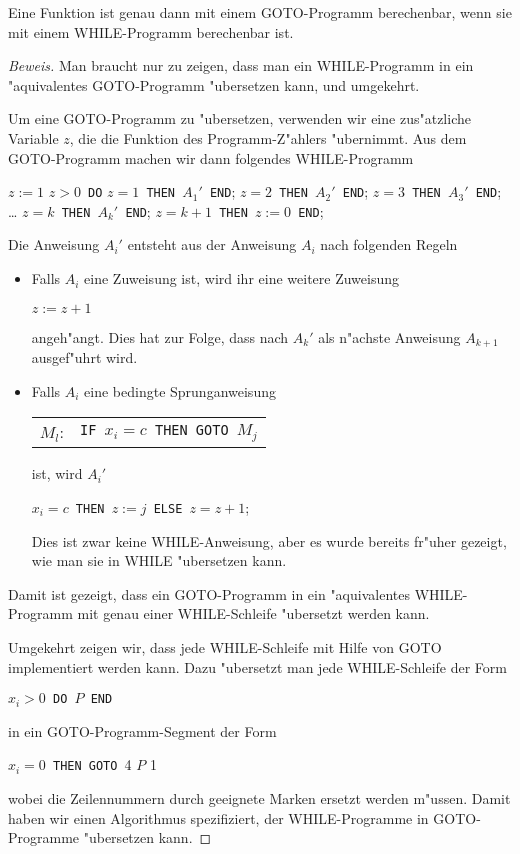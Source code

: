 \begin{satz}
Eine Funktion ist genau dann mit einem GOTO-Programm berechenbar,
wenn sie mit einem WHILE-Programm berechenbar ist.
\end{satz}
\begin{proof}[Beweis]
Man braucht nur zu zeigen, dass man ein WHILE-Programm in ein "aquivalentes
GOTO-Programm "ubersetzen kann, und umgekehrt.

Um eine GOTO-Programm zu "ubersetzen, verwenden wir eine zus"atzliche Variable
$z$, die die Funktion des Programm-Z"ahlers "ubernimmt.
Aus dem GOTO-Programm machen wir dann folgendes WHILE-Programm
\begin{algorithmic}
\STATE $z:=1$
$z>0${\tt\ DO}
$z=1${\tt\ THEN\ }$A_1'${\tt\ END};
$z=2${\tt\ THEN\ }$A_2'${\tt\ END};
$z=3${\tt\ THEN\ }$A_3'${\tt\ END};
\STATE\dots
{}$z=k${\tt\ THEN\ }$A_k'${\tt\ END};
$z=k+1${\tt\ THEN\ }$z:=0${\tt\ END};
\end{algorithmic}
Die Anweisung $A_i'$ entsteht aus der Anweisung $A_i$ nach folgenden
Regeln
\begin{itemize}
\item Falls $A_i$ eine Zuweisung ist, wird ihr eine weitere Zuweisung
\begin{algorithmic}
\STATE $z:=z+1$
\end{algorithmic}
angeh"angt. Dies hat zur Folge, dass nach $A_k'$ als n"achste Anweisung
$A_{k+1}$ ausgef"uhrt wird.
\item
Falls $A_i$ eine bedingte Sprunganweisung
\begin{center}
\begin{tabular}{rl}
$M_l$:&{\tt IF\ }$x_i=c${\tt\ THEN GOTO\ }$M_j$
\end{tabular}
\end{center}
ist, wird $A_i'$
\begin{algorithmic}
$x_i=c${\tt\ THEN\ }$z:=j${\tt\ ELSE }$z=z+1$;
\end{algorithmic}
Dies ist zwar keine WHILE-Anweisung, aber es wurde bereits
fr"uher gezeigt, wie man sie in WHILE "ubersetzen kann.
\end{itemize}
Damit ist gezeigt, dass ein GOTO-Programm in ein "aquivalentes WHILE-Programm
mit genau einer WHILE-Schleife "ubersetzt werden kann.

Umgekehrt zeigen wir, dass jede WHILE-Schleife mit Hilfe von GOTO
implementiert werden kann. Dazu "ubersetzt man jede WHILE-Schleife
der Form
\begin{algorithmic}
$x_i>0${\tt\ DO }$P${\tt\ END}
\end{algorithmic}
in ein GOTO-Programm-Segment der Form
\begin{algorithmic}[1]
$x_i=0${\tt\ THEN GOTO }4
\STATE$P$
1
\STATE
\end{algorithmic}
wobei die Zeilennummern durch geeignete Marken ersetzt werden m"ussen.
Damit haben wir einen Algorithmus spezifiziert, der WHILE-Programme in
GOTO-Programme "ubersetzen kann.
\end{proof}

